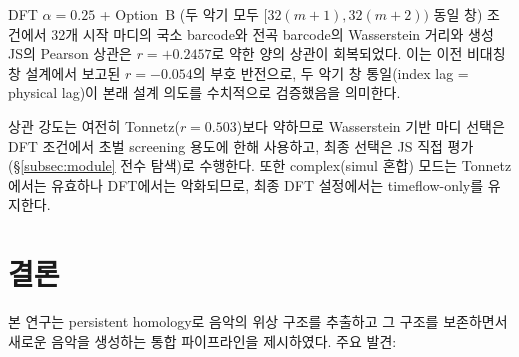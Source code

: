 \documentclass[11pt,a4paper]{article}
\begin{document}
DFT $\alpha=0.25$ + Option~B (두 악기 모두 $[32(m+1),32(m+2))$ 동일 창) 조건에서
32개 시작 마디의 국소 barcode와 전곡 barcode의 Wasserstein 거리와
생성 JS의 Pearson 상관은 $r = +0.2457$로 약한 양의 상관이 회복되었다.
이는 이전 비대칭 창 설계에서 보고된 $r = -0.054$의 부호 반전으로,
두 악기 창 통일(index lag = physical lag)이 본래 설계 의도를
수치적으로 검증했음을 의미한다.

상관 강도는 여전히 Tonnetz($r=0.503$)보다 약하므로
Wasserstein 기반 마디 선택은 DFT 조건에서 초벌 screening 용도에 한해
사용하고, 최종 선택은 JS 직접 평가(\S\ref{subsec:module} 전수 탐색)로 수행한다.
또한 complex(simul 혼합) 모드는 Tonnetz에서는 유효하나 DFT에서는 악화되므로,
최종 DFT 설정에서는 timeflow-only를 유지한다.


\section{결론}
\label{sec:conclusion}

본 연구는 persistent homology로 음악의 위상 구조를 추출하고
그 구조를 보존하면서 새로운 음악을 생성하는 통합 파이프라인을
제시하였다. 주요 발견:
\end{document}
